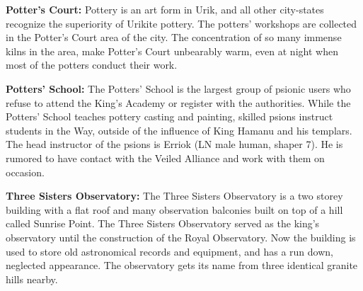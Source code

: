 {	\textbf{Potter's Court:} Pottery is an art form in Urik, and all other city-states recognize the superiority of Urikite pottery. The potters' workshops are collected in the Potter's Court area of the city. The concentration of so many immense kilns in the area, make Potter's Court unbearably warm, even at night when most of the potters conduct their work.

	\textbf{Potters' School:} The Potters' School is the largest group of psionic users who refuse to attend the King's Academy or register with the authorities. While the Potters' School teaches pottery casting and painting, skilled psions instruct students in the Way, outside of the influence of King Hamanu and his templars. The head instructor of the psions is Erriok (LN male human, shaper 7). He is rumored to have contact with the Veiled Alliance and work with them on occasion.

	\textbf{Three Sisters Observatory:} The Three Sisters Observatory is a two storey building with a flat roof and many observation balconies built on top of a hill called Sunrise Point. The Three Sisters Observatory served as the king's observatory until the construction of the Royal Observatory. Now the building is used to store old astronomical records and equipment, and has a run down, neglected appearance. The observatory gets its name from three identical granite hills nearby.
}
